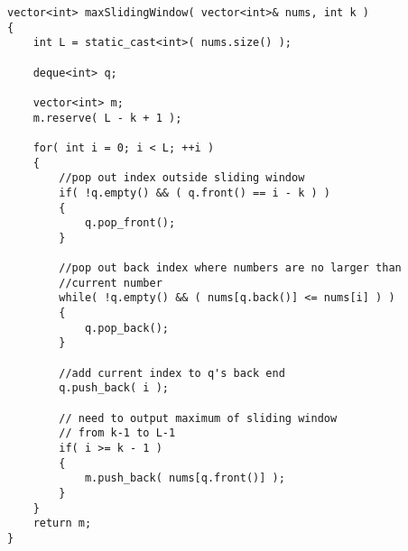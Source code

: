 \begin{lstlisting}[style=customc, caption={Deque}]
vector<int> maxSlidingWindow( vector<int>& nums, int k )
{
    int L = static_cast<int>( nums.size() );

    deque<int> q;

    vector<int> m;
    m.reserve( L - k + 1 );

    for( int i = 0; i < L; ++i )
    {
        //pop out index outside sliding window
        if( !q.empty() && ( q.front() == i - k ) )
        {
            q.pop_front();
        }

        //pop out back index where numbers are no larger than
        //current number
        while( !q.empty() && ( nums[q.back()] <= nums[i] ) )
        {
            q.pop_back();
        }

        //add current index to q's back end
        q.push_back( i );

        // need to output maximum of sliding window
        // from k-1 to L-1
        if( i >= k - 1 )
        {
            m.push_back( nums[q.front()] );
        }
    }
    return m;
}
\end{lstlisting}